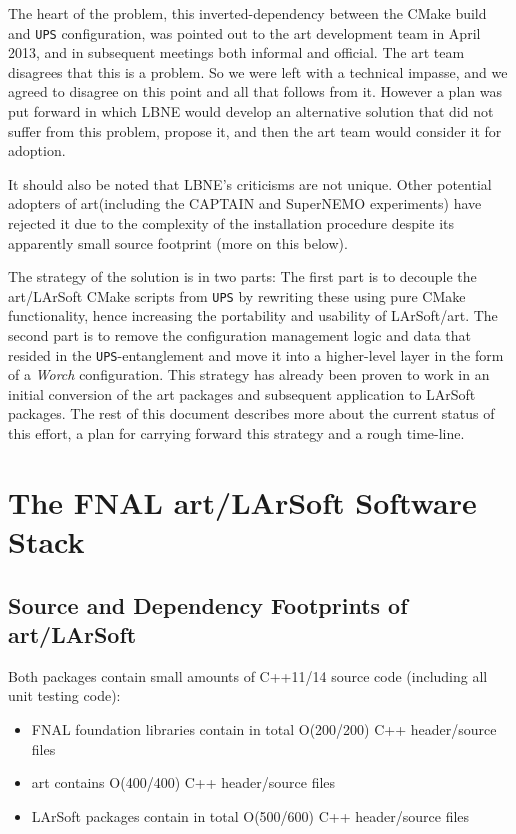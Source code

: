 \documentclass[usletter]{article}
\newcommand{\code}[1]{\texttt{#1}}
\newcommand{\worch}{\textit{Worch}\xspace}
\newcommand{\ups}{\code{UPS}\xspace}
\newcommand{\art}{art\xspace}
\newcommand{\larsoft}{LArSoft\xspace}
\begin{document}
The heart of the problem, this inverted-dependency between the CMake build
and \ups configuration, was pointed out to the \art development team in
April 2013, and in subsequent meetings both informal and official. The \art team disagrees that this is a problem.
So we were left with a technical impasse, and we agreed to disagree on this point and all 
that follows from it.  However a plan was put forward in which LBNE would develop an alternative solution that did not suffer from this 
problem, propose it, and then the \art team would consider it for adoption.

It should also be noted that LBNE's criticisms are not unique.   Other potential adopters of \art (including
the CAPTAIN and SuperNEMO experiments) have rejected it due to the complexity
of the installation procedure despite its apparently small source footprint (more on this below).

The strategy of the solution is in two parts: The first part is to
decouple the \art/\larsoft CMake scripts from \ups by rewriting these
using pure CMake functionality, hence increasing the portability and
usability of \larsoft/\art. The second part is to remove the
configuration management logic and data that resided in the
\ups-entanglement and move it into a higher-level layer in the form of a
\worch configuration. This strategy has already been proven to work in an
initial conversion of the \art packages and subsequent application to \larsoft packages.
The rest of this document describes more about the current status of this effort, a plan for
carrying forward this strategy and a rough time-line.

\section{The FNAL \art/\larsoft Software Stack}
\subsection{Source and Dependency Footprints of \art/\larsoft}

Both packages contain small amounts of C++11/14 source code (including all unit testing code):
\begin{itemize}

	\item FNAL foundation libraries contain in total O(200/200) C++ header/source files
	\item \art contains O(400/400) C++ header/source files
	\item \larsoft packages contain in total O(500/600) C++ header/source files

\end{itemize}
\end{document}
